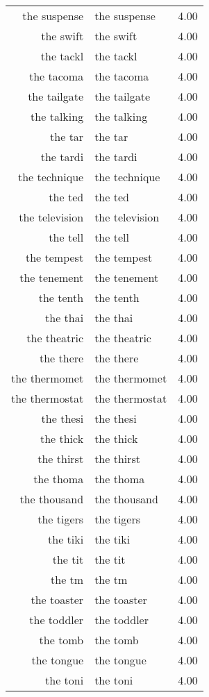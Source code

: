 \begin{table}[ht]
\begin{tabular}{rlr}
  the suspense & the suspense & 4.00 \\ 
  the swift & the swift & 4.00 \\ 
  the tackl & the tackl & 4.00 \\ 
  the tacoma & the tacoma & 4.00 \\ 
  the tailgate & the tailgate & 4.00 \\ 
  the talking & the talking & 4.00 \\ 
  the tar & the tar & 4.00 \\ 
  the tardi & the tardi & 4.00 \\ 
  the technique & the technique & 4.00 \\ 
  the ted & the ted & 4.00 \\ 
  the television & the television & 4.00 \\ 
  the tell & the tell & 4.00 \\ 
  the tempest & the tempest & 4.00 \\ 
  the tenement & the tenement & 4.00 \\ 
  the tenth & the tenth & 4.00 \\ 
  the thai & the thai & 4.00 \\ 
  the theatric & the theatric & 4.00 \\ 
  the there & the there & 4.00 \\ 
  the thermomet & the thermomet & 4.00 \\ 
  the thermostat & the thermostat & 4.00 \\ 
  the thesi & the thesi & 4.00 \\ 
  the thick & the thick & 4.00 \\ 
  the thirst & the thirst & 4.00 \\ 
  the thoma & the thoma & 4.00 \\ 
  the thousand & the thousand & 4.00 \\ 
  the tigers & the tigers & 4.00 \\ 
  the tiki & the tiki & 4.00 \\ 
  the tit & the tit & 4.00 \\ 
  the tm & the tm & 4.00 \\ 
  the toaster & the toaster & 4.00 \\ 
  the toddler & the toddler & 4.00 \\ 
  the tomb & the tomb & 4.00 \\ 
  the tongue & the tongue & 4.00 \\ 
  the toni & the toni & 4.00 \\ 

\end{tabular}
\end{table}
